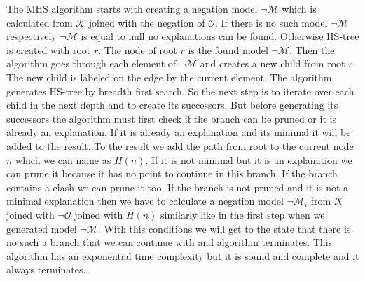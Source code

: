 \documentclass[12pt,a4paper]{article}
\begin{document}
The MHS algorithm starts with creating a negation model $\neg \mathcal{M}$ which is calculated from $\mathcal{K}$ joined with the negation of $\mathcal{O}$. If there is no such model $\neg \mathcal{M}$ respectively $\neg \mathcal{M}$ is equal to null no explanations can be found. Otherwise HS-tree is created with root $r$. The node of root $r$ is the found model $\neg \mathcal{M}$. Then the algorithm goes through each element of $\neg \mathcal{M}$ and creates a new child from root $r$. The new child is labeled on the edge by the current element. The algorithm generates HS-tree by breadth first search. So the next step is to iterate over each child in the next depth and to create its successors. But before generating its successors the algorithm must first check if the branch can be pruned or it is already an explanation. If it is already an explanation and its minimal it will be added to the result. To the result we add the path from root to the current node $n$ which we can name as $H(n)$. If it is not minimal but it is an explanation we can prune it because it has no point to continue in this branch. If the branch contains a clash we can prune it too. If the branch is not pruned and it is not a minimal explanation then we have to calculate a negation model $\neg \mathcal{M}_{i}$ from $\mathcal{K}$ joined with $\neg \mathcal{O}$ joined with $H(n)$ similarly like in the first step when we generated model $\neg \mathcal{M}$. With this conditions we will get to the state that there is no such a branch that we can continue with and algorithm terminates. This algorithm has an exponential time complexity but it is sound and complete and it always terminates.
\end{document}
